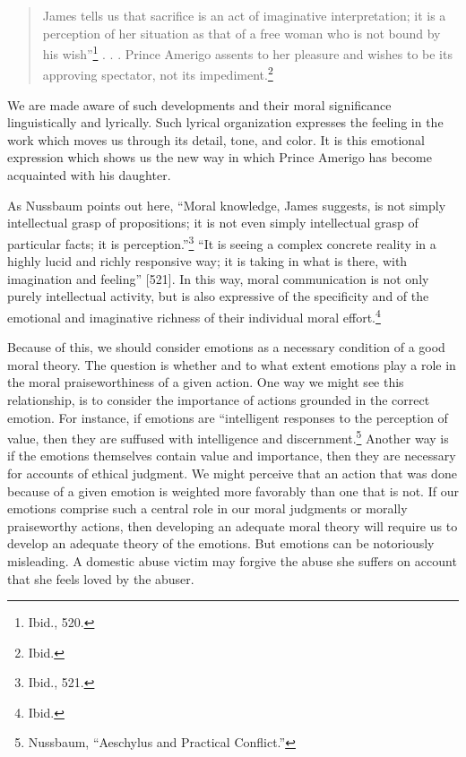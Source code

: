 \documentclass[
  12pt,
]{book}
\theoremstyle{definition}
\theoremstyle{definition}
\theoremstyle{definition}
\theoremstyle{definition}
\theoremstyle{remark}
\begin{document}
\begin{quote}
James tells us that sacrifice is an act of imaginative interpretation; it is a perception of her situation as that of a free woman who is not bound by his wish''\footnote{Ibid., 520.} . . . Prince Amerigo assents to her pleasure and wishes to be its approving spectator, not its impediment.\footnote{Ibid.}
\end{quote}

We are made aware of such developments and their moral significance linguistically and lyrically. Such lyrical organization expresses the feeling in the work which moves us through its detail, tone, and color. It is this emotional expression which shows us the new way in which Prince Amerigo has become acquainted with his daughter.

As Nussbaum points out here, ``Moral knowledge, James suggests, is not simply intellectual grasp of propositions; it is not even simply intellectual grasp of particular facts; it is perception.''\footnote{Ibid., 521.} ``It is seeing a complex concrete reality in a highly lucid and richly responsive way; it is taking in what is there, with imagination and feeling'' {[}521{]}. In this way, moral communication is not only purely intellectual activity, but is also expressive of the specificity and of the emotional and imaginative richness of their individual moral effort.\footnote{Ibid.}

Because of this, we should consider emotions as a necessary condition of a good moral theory. The question is whether and to what extent emotions play a role in the moral praiseworthiness of a given action. One way we might see this relationship, is to consider the importance of actions grounded in the correct emotion. For instance, if emotions are ``intelligent responses to the perception of value, then they are suffused with intelligence and discernment.\footnote{Nussbaum, {``Aeschylus and Practical Conflict.''}} Another way is if the emotions themselves contain value and importance, then they are necessary for accounts of ethical judgment. We might perceive that an action that was done because of a given emotion is weighted more favorably than one that is not. If our emotions comprise such a central role in our moral judgments or morally praiseworthy actions, then developing an adequate moral theory will require us to develop an adequate theory of the emotions. But emotions can be notoriously misleading. A domestic abuse victim may forgive the abuse she suffers on account that she feels loved by the abuser.
\end{document}
